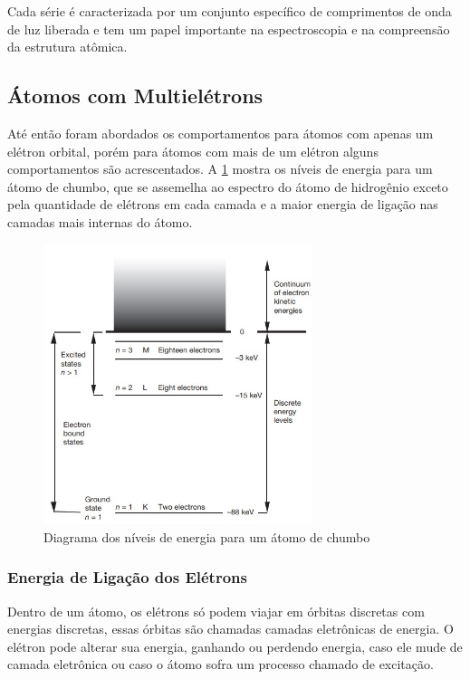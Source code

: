 \documentclass[11pt,a4paper]{article}
\begin{document}
    Cada série é caracterizada por um conjunto específico de comprimentos de onda de luz liberada e tem um papel importante na espectroscopia e na compreensão da estrutura atômica.

\subsection*{Átomos com Multielétrons}

	Até então foram abordados os comportamentos para átomos com apenas um elétron orbital, porém para átomos com mais de um elétron alguns comportamentos são acrescentados. A \ref{fig:diagramaNiveisDeEnergiaParaAtomosMultieletrons} mostra os níveis de energia para um átomo de chumbo, que se assemelha ao espectro do átomo de hidrogênio exceto pela quantidade de elétrons em cada camada e a maior energia de ligação nas camadas mais internas do átomo.

		\begin{figure}[h]
			\centering
			\includegraphics[width=0.7\textwidth]{Imagens/diagramaNiveisDeEnergiaParaAtomosMultieletrons.jpg}
			\caption{Diagrama dos níveis de energia para um átomo de chumbo}
			\label{fig:diagramaNiveisDeEnergiaParaAtomosMultieletrons}
		\end{figure}            

\subsubsection*{Energia de Ligação dos Elétrons}

    Dentro de um átomo, os elétrons só podem viajar em órbitas discretas com energias discretas, essas órbitas são chamadas camadas eletrônicas de energia. O elétron pode alterar sua energia, ganhando ou perdendo energia, caso ele mude de camada eletrônica ou caso o átomo sofra um processo chamado de excitação. 
\end{document}
